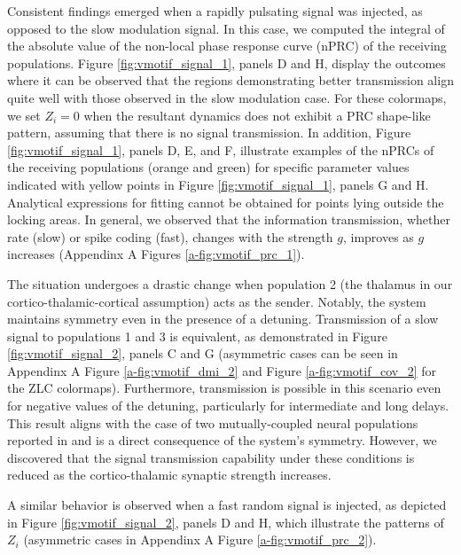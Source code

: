 \documentclass[../main.tex]{subfiles}
\begin{document}
Consistent findings emerged when a rapidly pulsating signal was injected, as opposed to the slow modulation signal.
In this case, we computed the integral of the absolute value of the non-local phase response curve (nPRC) of the receiving populations.
Figure \ref{fig:vmotif_signal_1}, panels D and H, display the outcomes where it can be observed that the regions demonstrating better transmission align quite well with those observed in the slow modulation case.
For these colormaps, we set $Z_i = 0$ when the resultant dynamics does not exhibit a PRC shape-like pattern, assuming that there is no signal transmission.
In addition, Figure \ref{fig:vmotif_signal_1}, panels D, E, and F, illustrate examples of the nPRCs of the receiving populations (orange and green) for specific parameter values indicated with yellow points in Figure \ref{fig:vmotif_signal_1}, panels G and H.
Analytical expressions for fitting cannot be obtained for points lying outside the locking areas.
In general, we observed that the information transmission, whether rate (slow) or spike coding (fast), changes with the strength $g$, improves as $g$ increases (Appendinx A Figures \ref{a-fig:vmotif_prc_1}).

The situation undergoes a drastic change when population 2 (the thalamus in our cortico-thalamic-cortical assumption) acts as the sender.
Notably, the system maintains symmetry even in the presence of a detuning.
Transmission of a slow signal to populations 1 and 3 is equivalent, as demonstrated in Figure \ref{fig:vmotif_signal_2}, panels C and G (asymmetric cases can be seen in Appendinx A Figure \ref{a-fig:vmotif_dmi_2} and  Figure \ref{a-fig:vmotif_cov_2} for the ZLC colormaps).
Furthermore, transmission is possible in this scenario even for negative values of the detuning, particularly for intermediate and long delays.
This result aligns with the case of two mutually-coupled neural populations reported in \citep{pariz_transmission_2021} and is a direct consequence of the system's symmetry.
However, we discovered that the signal transmission capability under these conditions is reduced as the cortico-thalamic synaptic strength increases.%

A similar behavior is observed when a fast random signal is injected, as depicted in Figure \ref{fig:vmotif_signal_2}, panels D and H, which illustrate the patterns of $Z_i$ (asymmetric cases in Appendinx A Figure \ref{a-fig:vmotif_prc_2}).
\end{document}
